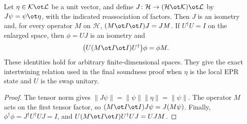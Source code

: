 \begin{theorem}
  \label{thm:pauli-ancilla-intertwining-support}
  \leanok
  Let $\eta\in\mathcal K\ot\mathcal L$ be a unit vector, and define
  $J\colon\mathcal H\to(\mathcal H\ot\mathcal K)\ot\mathcal L$ by
  $J\psi=\psi\ot\eta$, with the indicated reassociation of factors.
  Then $J$ is an isometry and, for every operator $M$ on $\mathcal H$,
  $(M\ot I\ot I)J=JM$.
  If $U^\dagger U=I$ on the enlarged space, then $\phi=UJ$ is an isometry
  and
  \[
    \bigl(U(M\ot I\ot I)U^\dagger\bigr)\phi=\phi M.
  \]
  These identities hold for arbitrary finite-dimensional spaces. They give
  the exact intertwining relation used in the final soundness proof when
  $\eta$ is the local EPR state and $U$ is the swap unitary.
\end{theorem}
\begin{proof}
  \leanok
  The tensor norm gives $\|J\psi\|=\|\psi\|\|\eta\|=\|\psi\|$.
  The operator $M$ acts on the first tensor factor, so
  $(M\ot I\ot I)J\psi=J(M\psi)$.
  Finally, $\phi^\dagger\phi=J^\dagger U^\dagger UJ=I$, and
  $U(M\ot I\ot I)U^\dagger UJ=UJM$.
\end{proof}

